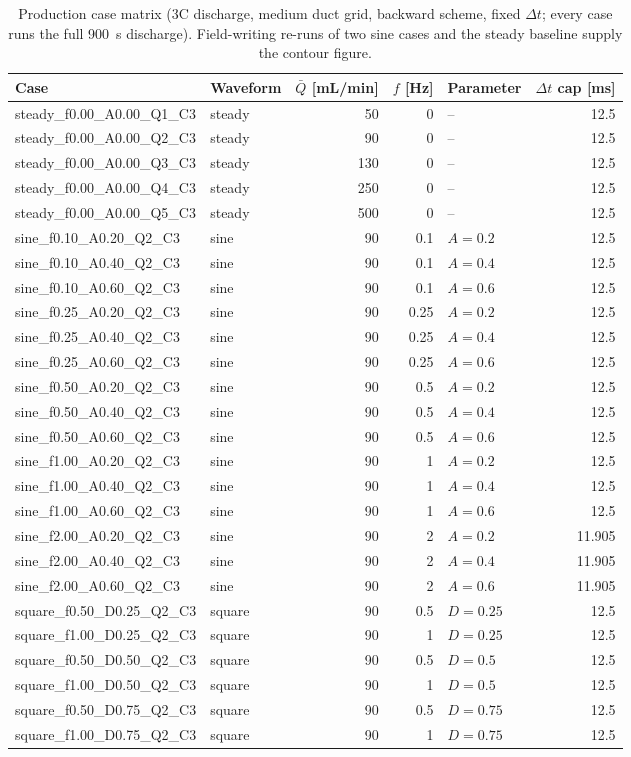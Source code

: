 \begin{table}[h]\centering\caption{Production case matrix (3C discharge, medium duct grid, backward scheme, fixed $\Delta t$; every case runs the full 900~s discharge). Field-writing re-runs of two sine cases and the steady baseline supply the contour figure.}\label{tab:matrix}
\small\begin{tabular}{llrrlr}\toprule
Case & Waveform & $\bar Q$ [mL/min] & $f$ [Hz] & Parameter & $\Delta t$ cap [ms] \\ \midrule
steady\_f0.00\_A0.00\_Q1\_C3 & steady & 50 & 0 & -- & 12.5 \\
steady\_f0.00\_A0.00\_Q2\_C3 & steady & 90 & 0 & -- & 12.5 \\
steady\_f0.00\_A0.00\_Q3\_C3 & steady & 130 & 0 & -- & 12.5 \\
steady\_f0.00\_A0.00\_Q4\_C3 & steady & 250 & 0 & -- & 12.5 \\
steady\_f0.00\_A0.00\_Q5\_C3 & steady & 500 & 0 & -- & 12.5 \\
sine\_f0.10\_A0.20\_Q2\_C3 & sine & 90 & 0.1 & $A=0.2$ & 12.5 \\
sine\_f0.10\_A0.40\_Q2\_C3 & sine & 90 & 0.1 & $A=0.4$ & 12.5 \\
sine\_f0.10\_A0.60\_Q2\_C3 & sine & 90 & 0.1 & $A=0.6$ & 12.5 \\
sine\_f0.25\_A0.20\_Q2\_C3 & sine & 90 & 0.25 & $A=0.2$ & 12.5 \\
sine\_f0.25\_A0.40\_Q2\_C3 & sine & 90 & 0.25 & $A=0.4$ & 12.5 \\
sine\_f0.25\_A0.60\_Q2\_C3 & sine & 90 & 0.25 & $A=0.6$ & 12.5 \\
sine\_f0.50\_A0.20\_Q2\_C3 & sine & 90 & 0.5 & $A=0.2$ & 12.5 \\
sine\_f0.50\_A0.40\_Q2\_C3 & sine & 90 & 0.5 & $A=0.4$ & 12.5 \\
sine\_f0.50\_A0.60\_Q2\_C3 & sine & 90 & 0.5 & $A=0.6$ & 12.5 \\
sine\_f1.00\_A0.20\_Q2\_C3 & sine & 90 & 1 & $A=0.2$ & 12.5 \\
sine\_f1.00\_A0.40\_Q2\_C3 & sine & 90 & 1 & $A=0.4$ & 12.5 \\
sine\_f1.00\_A0.60\_Q2\_C3 & sine & 90 & 1 & $A=0.6$ & 12.5 \\
sine\_f2.00\_A0.20\_Q2\_C3 & sine & 90 & 2 & $A=0.2$ & 11.905 \\
sine\_f2.00\_A0.40\_Q2\_C3 & sine & 90 & 2 & $A=0.4$ & 11.905 \\
sine\_f2.00\_A0.60\_Q2\_C3 & sine & 90 & 2 & $A=0.6$ & 11.905 \\
square\_f0.50\_D0.25\_Q2\_C3 & square & 90 & 0.5 & $D=0.25$ & 12.5 \\
square\_f1.00\_D0.25\_Q2\_C3 & square & 90 & 1 & $D=0.25$ & 12.5 \\
square\_f0.50\_D0.50\_Q2\_C3 & square & 90 & 0.5 & $D=0.5$ & 12.5 \\
square\_f1.00\_D0.50\_Q2\_C3 & square & 90 & 1 & $D=0.5$ & 12.5 \\
square\_f0.50\_D0.75\_Q2\_C3 & square & 90 & 0.5 & $D=0.75$ & 12.5 \\
square\_f1.00\_D0.75\_Q2\_C3 & square & 90 & 1 & $D=0.75$ & 12.5 \\
\bottomrule\end{tabular}\end{table}
